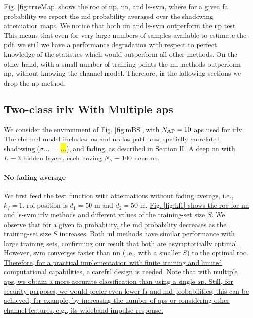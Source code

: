 \documentclass[draftcls,onecolumn,12pt]{IEEEtran}
\begin{document}
Fig. \ref{fig:trueMap} shows the \ac{roc}  of \ac{np}, \ac{nn}, and \ac{ls}-\ac{svm}, where for a given \ac{fa} probability we report the  \ac{md} probability averaged over the shadowing attenuation maps. We notice that both \ac{nn} and \ac{ls}-\ac{svm} outperform the \ac{np} test. This means that even for very large numbers of samples available to estimate the \ac{pdf}, we still we have a performance degradation with respect to perfect knowledge of the statistics which would outperform all other methods. On the other hand, with a small number of training points the \ac{ml} methods outperform \ac{np}, without knowing the channel model. Therefore, in the following sections we drop the \ac{np} method.
 




\subsection{Two-class \ac{irlv} With Multiple \acp{ap}}
\label{sec:res_fading}

\uline{We consider the environment of Fig. \ref{fig:mBS}, with $N_{\rm AP}=10$ \acp{ap} used for \ac{irlv}. The channel model includes \ac{los} and no-\ac{los} path-loss, spatially-correlated shadowing ($\sigma... =$ \hl{...}), and fading, as described in Section II. A deep \ac{nn} with $L=3$ hidden layers, each having $N_h = 100$ neurons.}  

\paragraph{No fading average} We first feed the test function with attenuations without fading average, i.e., $k_f=1$.  \ac{roi} position is $d_1 = 50$ m and $d_2 = 50$ m. \uline{Fig. \ref{fig:kf1} shows the \ac{roc} for \ac{nn}  and \ac{ls}-\ac{svm} \ac{irlv} methods and different values of the training-set size $S$. We observe that for a given \ac{fa} probability, the \ac{md} probability decreases as the training-set size $S$ increases. Both \ac{ml} methods have similar  performance  with large  training sets, confirming our result that both are asymptotically optimal. However,  \ac{svm} converges faster than \ac{nn} (i.e., with a smaller $S$) to the optimal \ac{roc}. Therefore, for a practical implementation with finite training and limited computational capabilities, a careful design is needed. Note that with multiple \acp{ap}, we obtain a more accurate classification than using a single \ac{ap}. Still, for security purposes, we would prefer even lower  \ac{fa} and \ac{md} probabilities; this can be achieved, for example, by increasing the number of \acp{ap} or considering other channel features, e.g., its wideband impulse response. }
\end{document}
